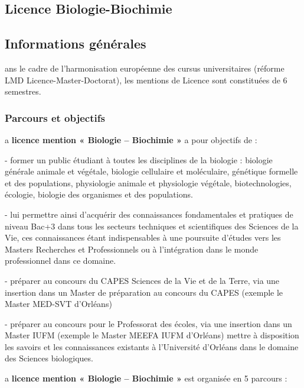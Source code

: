\documentclass[10pt, a5paper]{report}
\begin{document}
\begin{spacing}{1.5}

\chapter*{Licence Biologie-Biochimie}

\footnotesize
\section*{Informations générales}


ans le cadre de l’harmonisation européenne des cursus universitaires (réforme LMD Licence-Master-Doctorat), les mentions de Licence sont constituées de 6 semestres.

\subsection*{Parcours et objectifs}

a \textbf{licence mention « Biologie – Biochimie »} a pour  objectifs de : 

- former un public étudiant à toutes les disciplines de la biologie : biologie générale animale et végétale, biologie cellulaire et moléculaire, génétique formelle et des populations, physiologie animale et physiologie végétale, biotechnologies, écologie, biologie des organismes et des populations.

- lui permettre ainsi d’acquérir des connaissances fondamentales et pratiques de niveau Bac+3 dans tous les secteurs techniques et scientifiques des Sciences de la Vie, ces connaissances étant indispensables à une poursuite d’études vers les Masters Recherches et Professionnels ou à l’intégration dans le monde professionnel dans ce domaine.

- préparer au concours du CAPES Sciences de la Vie et de la Terre, via une insertion dans un Master de préparation au concours du CAPES (exemple le Master MED-SVT d’Orléans)

- préparer au concours pour le Professorat des écoles, via une insertion dans un Master IUFM (exemple le Master MEEFA IUFM d’Orléans) mettre à disposition les savoirs et les connaissances existants à l’Université d’Orléans dans le domaine des Sciences biologiques.
\newline

a \textbf{licence mention « Biologie – Biochimie »} est organisée en 5 parcours :


\end{spacing}
\end{document}
